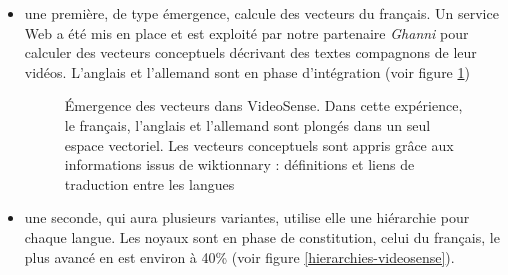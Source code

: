 \begin{itemize}

\item une première, de type émergence, calcule des vecteurs du français. Un service Web a été mis en place et est exploité par notre partenaire \textit{Ghanni} pour calculer des vecteurs conceptuels décrivant des textes compagnons de leur vidéos. L'anglais et l'allemand sont en phase d'intégration (voir figure \ref{emergence-videosense})


\begin{figure}[h!]
\caption{Émergence des vecteurs dans VideoSense. Dans cette expérience, le français, l'anglais et l'allemand sont plongés dans un seul espace vectoriel. Les vecteurs conceptuels sont appris grâce aux informations issus de wiktionnary  : définitions et liens de traduction entre les langues}
\label{emergence-videosense}
\end{figure}

\item une seconde, qui aura plusieurs variantes, utilise elle une hiérarchie pour chaque langue. Les noyaux sont en phase de constitution, celui du français, le plus avancé en est environ à 40\% (voir figure \ref{hierarchies-videosense}).



\end{itemize}
